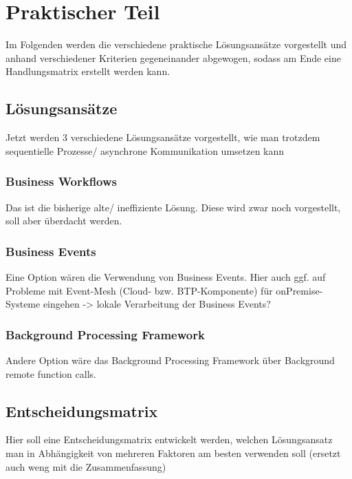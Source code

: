 \chapter{Praktischer Teil}

Im Folgenden werden die verschiedene praktische Lösungsansätze vorgestellt und anhand verschiedener Kriterien gegeneinander abgewogen, sodass am Ende eine Handlungsmatrix erstellt werden kann.

\section{Lösungsansätze}

Jetzt werden 3 verschiedene Lösungsansätze vorgestellt, wie man trotzdem sequentielle Prozesse/ asynchrone Kommunikation umsetzen kann

\subsection{Business Workflows}

Das ist die bisherige alte/ ineffiziente Lösung. Diese wird zwar noch vorgestellt, soll aber überdacht werden.

\subsection{Business Events}

Eine Option wären die Verwendung von Business Events. Hier auch ggf. auf Probleme mit Event-Mesh (Cloud- bzw. BTP-Komponente) für onPremise-Systeme eingehen -> lokale Verarbeitung der Business Events? 

\subsection{Background Processing Framework}

Andere Option wäre das Background Processing Framework über Background remote function calls.

\section{Entscheidungsmatrix}

Hier soll eine Entscheidungsmatrix entwickelt werden, welchen Lösungsansatz man in Abhängigkeit von mehreren Faktoren am besten verwenden soll (ersetzt auch weng mit die Zusammenfassung)